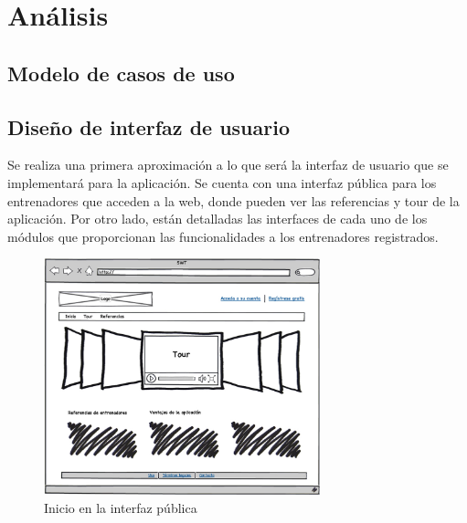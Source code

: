 %

\chapter{Análisis} %
	\label{cha:analisis}

% 
%
\section{Modelo de casos de uso} %
	\label{sec:modelo_casos_de_uso}
	

%
%
\section{Diseño de interfaz de usuario} %
	\label{sec:diseno_de_interfaz_de_usuario}

	Se realiza una primera aproximación a lo que será la interfaz de usuario que se implementará para la aplicación. Se cuenta con una interfaz pública para los entrenadores que acceden a la web, donde pueden ver las referencias y tour de la aplicación. Por otro lado, están detalladas las interfaces de cada uno de los módulos que proporcionan las funcionalidades a los entrenadores registrados.
	
	\begin{figure}[H]
	  \centering
	    \includegraphics[width=8cm]{./eps/1_Inicio.eps}
	  \caption{Inicio en la interfaz pública}
	  \label{fig:interfaz_publica_inicio}
	\end{figure}
	
